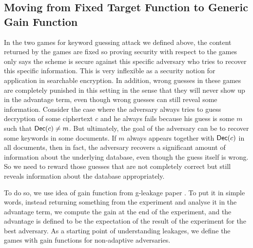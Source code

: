 \subsection{Moving from Fixed Target Function to Generic Gain Function}
In the two games for keyword guessing attack we defined above, the content returned by the games are fixed so proving security with respect to the games only says the scheme is secure against this specific adversary who tries to recover this specific information. This is very inflexible as a security notion for application in searchable encryption. In addition, wrong guesses in these games are completely punished in this setting in the sense that they will never show up in the advantage term, even though wrong guesses can still reveal some information. Consider the case where the adversary always tries to guess decryption of some ciphertext $c$ and he always fails because his guess is some $m$ such that $\mathsf{Dec}(c) \neq m$. But ultimately, the goal of the adversary can be to recover some keywords in some documents. If $m$ always appears together with $\mathsf{Dec}(c)$ in all documents, then in fact, the adversary recovers a significant amount of information about the underlying database, even though the guess itself is wrong. So we need to reward those guesses that are not completely correct but still reveals information about the database appropriately.

To do so, we use idea of gain function from g-leakage paper \cite{6266165}. To put it in simple words, instead returning something from the experiment and analyse it in the advantage term, we compute the gain at the end of the experiment, and the advantage is defined to be the expectation of the result of the experiment for the best adversary. As a starting point of understanding leakages, we define the games with gain functions for non-adaptive adversaries.


